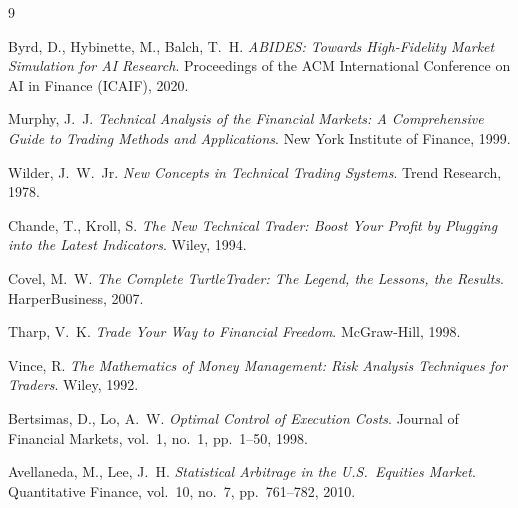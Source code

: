 \documentclass[11pt,a4paper]{article}
\begin{document}
\begin{thebibliography}{9}

Byrd, D., Hybinette, M., Balch, T.\ H.
\emph{ABIDES: Towards High-Fidelity Market Simulation for AI
Research}.
Proceedings of the ACM International Conference on AI in Finance
(ICAIF), 2020.

Murphy, J.\ J.
\emph{Technical Analysis of the Financial Markets: A Comprehensive
Guide to Trading Methods and Applications}.
New York Institute of Finance, 1999.

Wilder, J.\ W.\ Jr.
\emph{New Concepts in Technical Trading Systems}.
Trend Research, 1978.

Chande, T., Kroll, S.
\emph{The New Technical Trader: Boost Your Profit by Plugging into
the Latest Indicators}.
Wiley, 1994.

Covel, M.\ W.
\emph{The Complete TurtleTrader: The Legend, the Lessons, the
Results}.
HarperBusiness, 2007.

Tharp, V.\ K.
\emph{Trade Your Way to Financial Freedom}.
McGraw-Hill, 1998.

Vince, R.
\emph{The Mathematics of Money Management: Risk Analysis Techniques
for Traders}.
Wiley, 1992.

Bertsimas, D., Lo, A.\ W.
\emph{Optimal Control of Execution Costs}.
Journal of Financial Markets, vol.\ 1, no.\ 1, pp.\ 1--50, 1998.

Avellaneda, M., Lee, J.\ H.
\emph{Statistical Arbitrage in the U.S.\ Equities Market}.
Quantitative Finance, vol.\ 10, no.\ 7, pp.\ 761--782, 2010.

\end{thebibliography}
\end{document}

